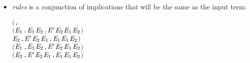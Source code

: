 \begin{itemize}
\item \emph{rules} is a conjunction of implications that will be the
    same as the input term:
\begin{alltt}
\HOLTokenTurnstile{} \ensuremath{(}\HOLSymConst{\HOLTokenForall{}}.
        \ensuremath{(}\HOLSymConst{\HOLTokenForall{}}\ensuremath{\HOLBoundVar{E}\sb{\mathrm{1}}}.  \HOLTokenTransBegin{} \HOLTokenTransEnd \ensuremath{\HOLBoundVar{E}\sb{\mathrm{1}}} \HOLSymConst{\HOLTokenImp{}} \HOLSymConst{\HOLTokenExists{}}\ensuremath{\HOLBoundVar{E}\sb{\mathrm{2}}}. \ensuremath{\HOLFreeVar{E}\sp{\prime}} \HOLTokenWeakTransBegin{} \HOLTokenWeakTransEnd \ensuremath{\HOLBoundVar{E}\sb{\mathrm{2}}} \HOLSymConst{\HOLTokenConj{}} \ensuremath{\HOLBoundVar{E}\sb{\mathrm{1}}} \HOLSymConst{\HOLTokenWeakEQ} \ensuremath{\HOLBoundVar{E}\sb{\mathrm{2}}}\ensuremath{)} \HOLSymConst{\HOLTokenConj{}}
        \HOLSymConst{\HOLTokenForall{}}\ensuremath{\HOLBoundVar{E}\sb{\mathrm{2}}}. \ensuremath{\HOLFreeVar{E}\sp{\prime}} \HOLTokenTransBegin{} \HOLTokenTransEnd \ensuremath{\HOLBoundVar{E}\sb{\mathrm{2}}} \HOLSymConst{\HOLTokenImp{}} \HOLSymConst{\HOLTokenExists{}}\ensuremath{\HOLBoundVar{E}\sb{\mathrm{1}}}.  \HOLTokenWeakTransBegin{} \HOLTokenWeakTransEnd \ensuremath{\HOLBoundVar{E}\sb{\mathrm{1}}} \HOLSymConst{\HOLTokenConj{}} \ensuremath{\HOLBoundVar{E}\sb{\mathrm{1}}} \HOLSymConst{\HOLTokenWeakEQ} \ensuremath{\HOLBoundVar{E}\sb{\mathrm{2}}}\ensuremath{)} \HOLSymConst{\HOLTokenConj{}}
   \ensuremath{(}\HOLSymConst{\HOLTokenForall{}}\ensuremath{\HOLBoundVar{E}\sb{\mathrm{1}}}.  \HOLTokenTransBegin\HOLSymConst{\ensuremath{\tau}}\HOLTokenTransEnd \ensuremath{\HOLBoundVar{E}\sb{\mathrm{1}}} \HOLSymConst{\HOLTokenImp{}} \HOLSymConst{\HOLTokenExists{}}\ensuremath{\HOLBoundVar{E}\sb{\mathrm{2}}}. \ensuremath{\HOLFreeVar{E}\sp{\prime}} \HOLSymConst{\HOLTokenEPS} \ensuremath{\HOLBoundVar{E}\sb{\mathrm{2}}} \HOLSymConst{\HOLTokenConj{}} \ensuremath{\HOLBoundVar{E}\sb{\mathrm{1}}} \HOLSymConst{\HOLTokenWeakEQ} \ensuremath{\HOLBoundVar{E}\sb{\mathrm{2}}}\ensuremath{)} \HOLSymConst{\HOLTokenConj{}}
   \ensuremath{(}\HOLSymConst{\HOLTokenForall{}}\ensuremath{\HOLBoundVar{E}\sb{\mathrm{2}}}. \ensuremath{\HOLFreeVar{E}\sp{\prime}} \HOLTokenTransBegin\HOLSymConst{\ensuremath{\tau}}\HOLTokenTransEnd \ensuremath{\HOLBoundVar{E}\sb{\mathrm{2}}} \HOLSymConst{\HOLTokenImp{}} \HOLSymConst{\HOLTokenExists{}}\ensuremath{\HOLBoundVar{E}\sb{\mathrm{1}}}.  \HOLSymConst{\HOLTokenEPS} \ensuremath{\HOLBoundVar{E}\sb{\mathrm{1}}} \HOLSymConst{\HOLTokenConj{}} \ensuremath{\HOLBoundVar{E}\sb{\mathrm{1}}} \HOLSymConst{\HOLTokenWeakEQ} \ensuremath{\HOLBoundVar{E}\sb{\mathrm{2}}}\ensuremath{)} \HOLSymConst{\HOLTokenImp{}}

\end{alltt}
\end{itemize}

